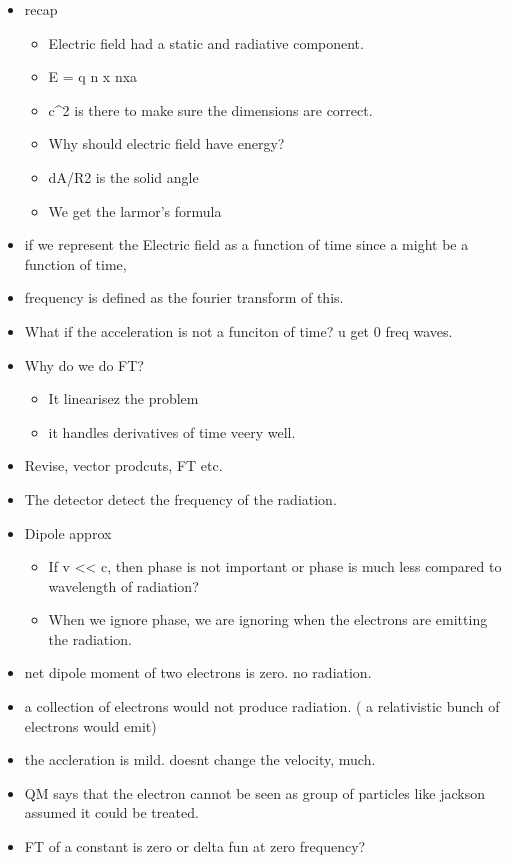 \documentclass{../template/texnote}
\begin{document}
\begin{itemize}
\item
  recap

  \begin{itemize}
  \tightlist
  \item
    Electric field had a static and radiative component.
  \item
    E = q n x nxa
  \item
    c\^{}2 is there to make sure the dimensions are correct.
  \item
    Why should electric field have energy?
  \item
    dA/R2 is the solid angle
  \item
    We get the larmor's formula
  \end{itemize}
\item
  if we represent the Electric field as a function of time since a might
  be a function of time,
\item
  frequency is defined as the fourier transform of this.
\item
  What if the acceleration is not a funciton of time? u get 0 freq
  waves.
\item
  Why do we do FT?

  \begin{itemize}
  \tightlist
  \item
    It linearisez the problem
  \item
    it handles derivatives of time veery well.
  \end{itemize}
\item
  Revise, vector prodcuts, FT etc.
\item
  The detector detect the frequency of the radiation.
\item
  Dipole approx

  \begin{itemize}
  \tightlist
  \item
    If v \textless\textless{} c, then phase is not important or phase is
    much less compared to wavelength of radiation?
  \item
    When we ignore phase, we are ignoring when the electrons are
    emitting the radiation.
  \end{itemize}
\item
  net dipole moment of two electrons is zero. no radiation.
\item
  a collection of electrons would not produce radiation. ( a
  relativistic bunch of electrons would emit)
\item
  the accleration is mild. doesnt change the velocity, much.
\item
  QM says that the electron cannot be seen as group of particles like
  jackson assumed it could be treated.
\item
  FT of a constant is zero or delta fun at zero frequency?
\end{itemize}
\end{document}
